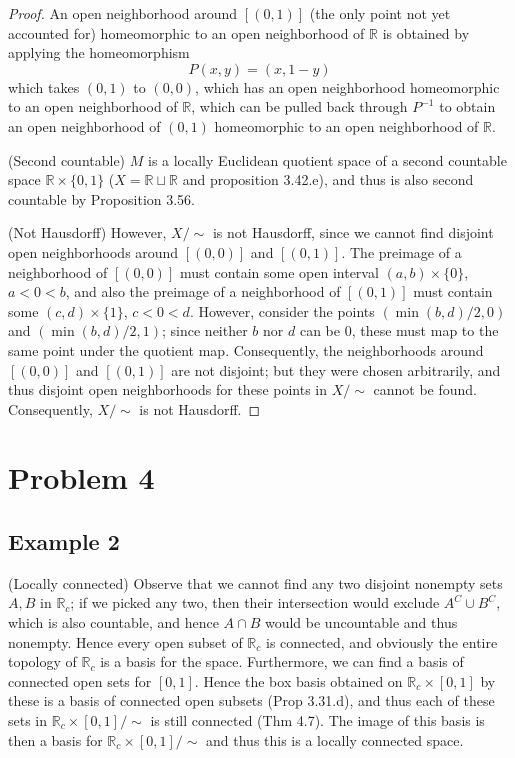 \documentclass{article}
\theoremstyle{definition}
\newcommand{\R}{\mathbb{R}}
\begin{document}
\begin{proof}
An open neighborhood around $[(0,1)]$ (the only point not yet
accounted for) homeomorphic to an open 
neighborhood of $\R$ is obtained by applying the homeomorphism
\[
P(x,y) = (x,1-y)
\]
which takes $(0,1)$ to $(0,0)$, which has an open neighborhood
homeomorphic to an open neighborhood of $\R$, which can be pulled
back through $P^{-1}$ to obtain an open neighborhood of $(0,1)$
homeomorphic to an open neighborhood of $\R$.

(Second countable) 
$M$ is a locally Euclidean quotient space of a 
second countable space $\R \times \{0,1\}$ ($X = \R \sqcup \R$ and 
proposition 3.42.e), and thus is also 
second countable by Proposition 3.56.

(Not Hausdorff) 
However, $X / \sim$ is not Hausdorff, since we cannot find disjoint 
open neighborhoods around $[(0,0)]$ and $[(0,1)]$. The preimage of a neighborhood
of $[(0,0)]$ must contain some open interval $(a,b) \times \{0\}$,
$a < 0 < b$,
and also the preimage of a neighborhood of $[(0,1)]$ must contain
some $(c,d) \times \{1\}$, $c < 0 < d$. However, consider the points 
$(\min(b,d)/2,0)$ and $(\min(b,d)/2,1)$; since neither $b$ nor $d$ can
be $0$, these must map to the same point under the quotient map. 
Consequently, the neighborhoods around $[(0,0)]$ and $[(0,1)]$ are
not disjoint; but they were chosen arbitrarily, and thus disjoint
open neighborhoods for these points in $X / \sim$ cannot be found.
Consequently, $X / \sim$ is not Hausdorff.
\end{proof}

\section{Problem 4}
\subsection{Example 2}
(Locally connected)
Observe that we cannot find any two disjoint nonempty sets $A,B$ in $\R_c$;
if we picked any two, then their intersection would exclude $A^C \cup B^C$,
which is also countable, and hence $A \cap B$ would be uncountable and thus
nonempty.
Hence every open subset of $\R_c$ is connected, and obviously the entire topology
of $\R_c$
is a basis for the space. Furthermore, we can find a 
basis of connected open sets for $[0,1]$. Hence the box basis obtained on 
$\R_c \times [0,1]$ by these is a basis of connected open subsets (Prop 3.31.d), 
and thus each of these sets in $\R_c \times [0,1] / \sim$ is still connected 
(Thm 4.7). The image of this basis is then a basis for $\R_c\times[0,1]/\sim$
and thus this is a locally connected space.
\end{document}
